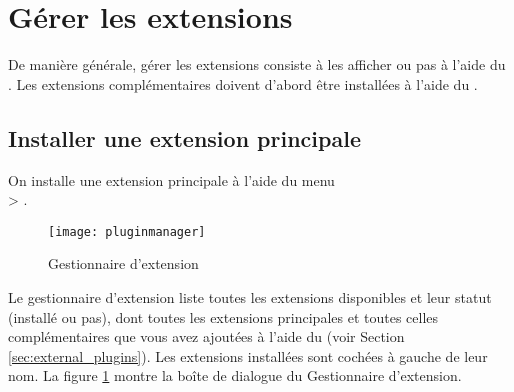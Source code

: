 \section{Gérer les extensions}\label{sec:managing_plugins}

De manière générale, gérer les extensions consiste à les afficher ou pas à l'aide du\\ .
Les extensions complémentaires doivent d'abord être installées à l'aide du .

\subsection{Installer une extension principale}\label{sec:load_core_plugin} 

On installe une extension principale à l'aide du menu\\  > .

\begin{figure}[ht]
   \begin{center}
   \texttt{[image: pluginmanager]}
   \caption{Gestionnaire d'extension \nixcaption}\label{fig:pluginmanager}
\end{center}
\end{figure}

Le gestionnaire d'extension liste toutes les extensions disponibles et leur statut (installé ou pas), dont toutes les extensions principales et toutes celles complémentaires que vous avez ajoutées à l'aide du  (voir Section \ref{sec:external_plugins}). Les extensions installées sont cochées à gauche de leur nom. La figure \ref{fig:pluginmanager} montre la boîte de dialogue du Gestionnaire d'extension.

